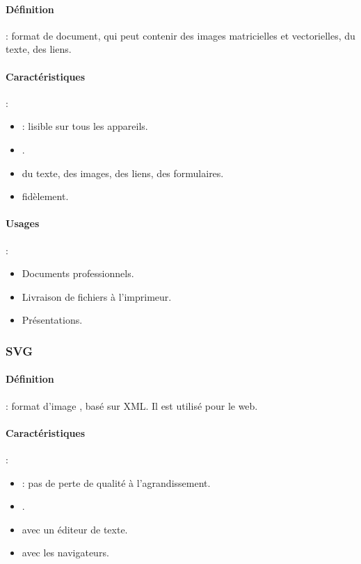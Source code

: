 \paragraph{Définition} : format de document, qui peut contenir des images matricielles et vectorielles, du texte, des liens.

\paragraph{Caractéristiques} :
\begin{itemize}
    \item {} : lisible sur tous les appareils.
    \item {}.
    \item {} du texte, des images, des liens, des formulaires.
    \item {} fidèlement.
\end{itemize}

\paragraph{Usages} :
\begin{itemize}
    \item Documents professionnels.
    \item Livraison de fichiers à l'imprimeur.
    \item Présentations.
\end{itemize}

\subsubsection{SVG}

\paragraph{Définition} : format d'image , basé sur XML. Il est utilisé pour le web.

\paragraph{Caractéristiques} :
\begin{itemize}
    \item {} : pas de perte de qualité à l'agrandissement.
    \item {}.
    \item {} avec un éditeur de texte.
    \item {} avec les navigateurs.
\end{itemize}

